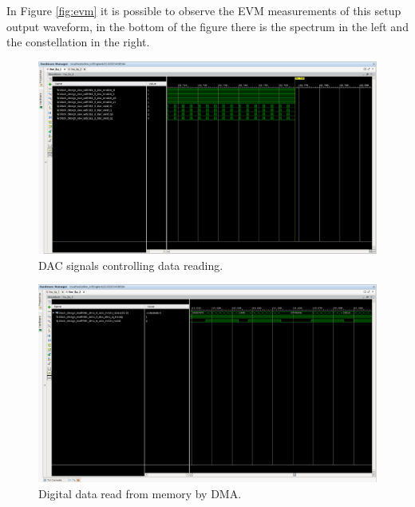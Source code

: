 In Figure \ref{fig:evm} it is possible to observe the EVM measurements of this
setup output waveform, in the bottom of the figure there is the spectrum in the
left and the constellation in the right.

\begin{figure}[htbp]
    \centering
    \includegraphics[width=1\textwidth,
    trim={{.15\textwidth} {1.2\textwidth} {.7\textwidth} {.16\textwidth}},
    clip]{./figures/dac_signals}
    \caption{ DAC signals controlling data reading.
    \label{fig:dacsignals}}
\end{figure}

\begin{figure}[htbp]
    \centering
    \includegraphics[width=1\textwidth,
    trim={{.15\textwidth} {1.3\textwidth} {.05\textwidth} {.16\textwidth}},
    clip]{./figures/ila_dataflow}
    \caption{ Digital data read from memory by DMA.
    \label{fig:dataflowdig}}
\end{figure}

